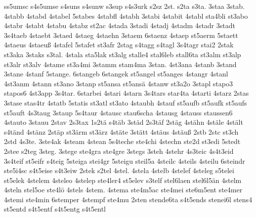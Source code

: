 {    ss5umsc
    s4s5umse
    s4suns
    s4sunw
    s3sup
    s4s3urk
    s2sz
    2st.
    s2ta
    s3ta.
    3staa
    3stab.
    4stabb
    4stabd
    4stabel
    5stabes
    4stabfl
    4stabh
    3stabi
    4stabit
    4stabl
    sta4bli
    st3abo
    4stabr
    4stabt
    4stabu
    4stabz
    st2ac
    4stada
    3stadi
    4stadj
    4stadm
    4stadr
    3stadt
    3s4taeb
    4staebt
    3staed
    4staeg
    4staehn
    3staem
    6staenz
    4staep
    st5aerm
    5staett
    4staeus
    4staeuß
    4stafel
    5stafet
    st3afr
    2stag
    s4tagg
    s4tagl
    3s4tagr
    stai2
    2stak
    st3aka
    3staks
    s3tal.
    4stala
    sta5lak
    st3alg
    stalle4
    stal6leb
    stall6ta
    st3alm
    st3alp
    st3alr
    st3alv
    4stame
    st3a4mi
    3stamm
    stam4ma
    3stan.
    4st3ana
    4stanb
    3stand
    3stane
    4stanf
    5stange.
    6stangeb
    6stangek
    st5angel
    st5anges
    4stangr
    4stanl
    4st3anm
    4stann
    st3ano
    3stanp
    st5ansa
    st5ansä
    4stanw
    st3a2o
    3stapl
    stapo3
    stapos6
    4st3app
    3s4tar.
    6starbei
    4stari
    4starn
    3s4tars
    star4ta
    4starti
    4starz
    2stas
    3stase
    stas4tr
    4statb
    5statis
    st3atl
    st3ato
    4staubh
    4stauf
    st5aufb
    st5aufk
    st5aufs
    st5auft
    4s3taug
    3staup
    5s4taur
    4stausc
    stau6scha
    4stausg
    4stauss
    staussen6
    4stauto
    3stauu
    2stav
    2s3tax
    1s2tä
    s4täb
    3städ
    2s3täf
    2stäg
    4stähn
    4stäle
    4stält
    s4tänd
    4stänz
    2stäp
    st3ärm
    st3ärz
    4stäte
    3stätt
    4stäus
    4stäuß
    2stb
    2stc
    st3ch
    2std
    4s3te.
    3ste4ak
    4steam
    4stean
    5s4teche
    ste4chi
    4stechn
    ste2d
    st3edi
    5stedt
    2stee
    s2teg
    3steg.
    3stege
    ste4gra
    ste4gre
    3stegs
    3steh
    4stehr
    4s3teic
    4s4t3eid
    3s4teif
    st5eifr
    s4teig
    5steiga
    stei4gr
    5steigu
    steil5a
    4steilc
    4steils
    4steilu
    6steindr
    ste5i4sc
    s4t5eise
    s4t3eiw
    2stek
    s2tel
    4stel.
    4stela
    4stelb
    4stelef
    4steleg
    s5telei
    st5elek
    4stelem
    4steleo
    4stelep
    ste4ler4
    st5elev
    s3telf
    stel6laen
    stel6l5än
    4stelm
    4steln
    stel5oe
    ste4lö
    4stels
    4stem.
    4stema
    ste4m5ac
    ste4mei
    ste6m5ent
    ste4mer
    4stemi
    ste4min
    6stemper
    4stempf
    ste4mu
    2sten
    stende6ta
    s4t5ends
    stenei6l
    stens4
    st5entd
    s4t5entf
    s4t5entg
    s4t5entl
}
